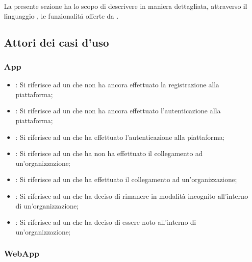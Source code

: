 \documentclass[../analisi-dei-requisiti]{subfiles}
\begin{document}
La presente sezione ha lo scopo di descrivere in maniera dettagliata, attraverso il linguaggio , le funzionalitá offerte da .

\subsection{Attori dei casi d'uso}
\label{sub:attori_casi_duso}

\subsubsection{App}
\label{subsub:utenti}

\begin{itemize}
  \item \textbf{}: Si riferisce ad un  che non ha ancora effettuato la registrazione alla piattaforma;
  \item \textbf{}: Si riferisce ad un  che non ha ancora effettuato l'autenticazione alla piattaforma;
  \item \textbf{}: Si riferisce ad un  che ha effettuato l'autenticazione alla piattaforma;
  \item \textbf{}: Si riferisce ad un  che ha non ha effettuato il collegamento ad un'organizzazione;
  \item \textbf{}: Si riferisce ad un  che ha effettuato il collegamento ad un'organizzazione;
  \item \textbf{}: Si riferisce ad un  che ha deciso di rimanere in modalità incognito all'interno di un'organizzazione;
  \item \textbf{}: Si riferisce ad un  che ha deciso di essere noto all'interno di un'organizzazione;
\end{itemize}

\subsubsection{WebApp}
\label{subsub:super_utenti}
\end{document}
